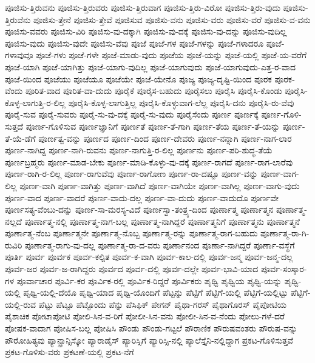 {ಪೂಜಿಸು-ತ್ತಿರುವನು
ಪೂಜಿಸು-ತ್ತಿರುವರು
ಪೂಜಿಸು-ತ್ತಿರುವಾಗ
ಪೂಜಿಸು-ತ್ತಿರು-ವಿರೋ
ಪೂಜಿಸು-ತ್ತಿರು-ವುದು
ಪೂಜಿಸು-ತ್ತಿರುವೆನು
ಪೂಜಿಸು-ತ್ತೇನೆ
ಪೂಜಿಸು-ತ್ತೇವೆ
ಪೂಜಿಸುವ
ಪೂಜಿಸು-ವನು
ಪೂಜಿಸು-ವರು
ಪೂಜಿಸು-ವರೆ
ಪೂಜಿಸು-ವ-ವನು
ಪೂಜಿಸು-ವವರು
ಪೂಜಿಸು-ವಿರಿ
ಪೂಜಿಸು-ವು-ದಕ್ಕಾಗಿ
ಪೂಜಿಸು-ವು-ದಕ್ಕೆ
ಪೂಜಿಸು-ವು-ದನ್ನು
ಪೂಜಿಸು-ವುದಿಲ್ಲ
ಪೂಜಿಸು-ವುದು
ಪೂಜಿಸು-ವುದೇ
ಪೂಜಿಸು-ವೆವು
ಪೂಜೆ
ಪೂಜೆ-ಗಳ
ಪೂಜೆ-ಗಳನ್ನು
ಪೂಜೆ-ಗಳಾದರೂ
ಪೂಜೆ-ಗಳಾವುವೂ
ಪೂಜೆ-ಗಳು
ಪೂಜೆ-ಗಳೇ
ಪೂಜೆ-ಮಾಡು-ವುದು
ಪೂಜೆಯ
ಪೂಜೆ-ಯನ್ನು
ಪೂಜೆ-ಯಲ್ಲಿ
ಪೂಜೆ-ಯ-ವರೆಗೆ
ಪೂಜೆ-ಯಾಗಿ
ಪೂಜೆ-ಯಾಗಿತ್ತು
ಪೂಜೆ-ಯಾಗು-ವುದಿಲ್ಲ
ಪೂಜೆ-ಯಾಗುವುದು
ಪೂಜೆ-ಯಾಗುವುದು-ಎತ್ತ-ರ-ವಾದ
ಪೂಜೆ-ಯಿಂದ
ಪೂಜೆಯು
ಪೂಜೆಯೂ
ಪೂಜೆಯೇ
ಪೂಜೆ-ಯೇನೊ
ಪೂಜ್ಯ
ಪೂಜ್ಯ-ದೃಷ್ಟಿ-ಯಿಂದ
ಪೂರಕ
ಪೂರಕ-ವೆಂದು
ಪೂರಿತ-ವಾದ
ಪೂರಿತ-ವಾ-ದುದು
ಪೂರೈಕೆ
ಪೂರೈಸ-ಬಹುದು
ಪೂರೈಸಲು
ಪೂರೈಸಿ
ಪೂರೈಸಿ-ಕೊಂಡು
ಪೂರೈಸಿ-ಕೊಳ್ಳ-ಲಾಗುತ್ತಿ-ರ-ಲಿಲ್ಲ
ಪೂರೈಸಿ-ಕೊಳ್ಳ-ಲಾಗುತ್ತಿಲ್ಲ
ಪೂರೈಸಿ-ಕೊಳ್ಳುವಾಗ-ಲೆಲ್ಲ
ಪೂರೈಸಿ-ದನು
ಪೂರೈಸಿ-ರು-ವೆವು
ಪೂರೈ-ಸುವ
ಪೂರೈ-ಸುವರು
ಪೂರೈ-ಸು-ವು-ದಕ್ಕೆ
ಪೂರೈ-ಸು-ವುದು
ಪೂರೈಸೆಂದು
ಪೂರ್ಣ
ಪೂರ್ಣಕ್ಕೆ
ಪೂರ್ಣ-ಗೊಳಿ-ಸುತ್ತದೆ
ಪೂರ್ಣ-ಗೊಳಿಸುವ
ಪೂರ್ಣಜ್ಞಾನಿಗೆ
ಪೂರ್ಣತೆ
ಪೂರ್ಣ-ತೆ-ಗಾಗಿ
ಪೂರ್ಣ-ತೆಯ
ಪೂರ್ಣ-ತೆ-ಯನ್ನು
ಪೂರ್ಣ-ತೆ-ಯೆ-ಡೆಗೆ
ಪೂರ್ಣತ್ವ-ವನ್ನು
ಪೂರ್ಣದ
ಪೂರ್ಣ-ದಿಂದ
ಪೂರ್ಣ-ದೇವರು
ಪೂರ್ಣ-ನನ್ನಾಗಿ
ಪೂರ್ಣ-ನಾಗ-ಲಾರ
ಪೂರ್ಣ-ನಾಗಿದ್ದ
ಪೂರ್ಣ-ನಾಗಿ-ರುವನು
ಪೂರ್ಣ-ನಾಗುತ್ತಿ-ರ-ಲಿಲ್ಲ
ಪೂರ್ಣನು
ಪೂರ್ಣ-ಪರಿ-ಶುದ್ಧ-ತೆಯೆ
ಪೂರ್ಣಬ್ರಹ್ಮರು
ಪೂರ್ಣ-ಮಾಡ-ಬೇಕು
ಪೂರ್ಣ-ಮಾಡಿ-ಕೊಳ್ಳು-ವು-ದಕ್ಕೆ
ಪೂರ್ಣ-ರಾಗದೆ
ಪೂರ್ಣ-ರಾಗ-ಲಾರೆವು
ಪೂರ್ಣ-ರಾಗಿ-ರ-ಲಿಲ್ಲ
ಪೂರ್ಣ-ರಾಗುವೆವು
ಪೂರ್ಣ-ರಾಗೋಣ
ಪೂರ್ಣ-ರಾ-ದಷ್ಟೂ
ಪೂರ್ಣ-ವನ್ನು
ಪೂರ್ಣ-ವಾಗ-ಲಿಲ್ಲ
ಪೂರ್ಣ-ವಾಗಿ
ಪೂರ್ಣ-ವಾಗಿತ್ತು
ಪೂರ್ಣ-ವಾಗಿದೆ
ಪೂರ್ಣ-ವಾಗಿಯೇ
ಪೂರ್ಣ-ವಾಗಿಲ್ಲ
ಪೂರ್ಣ-ವಾಗು-ವುದು
ಪೂರ್ಣ-ವಾದ
ಪೂರ್ಣ-ವಾದರೆ
ಪೂರ್ಣ-ವಾದು-ದಲ್ಲ
ಪೂರ್ಣ-ವಾ-ದುದು
ಪೂರ್ಣ-ವಾದುದೊ
ಪೂರ್ಣವೇ
ಪೂರ್ಣಸತ್ಯ-ವೆಂಬು-ದನ್ನು
ಪೂರ್ಣ-ಸಾ-ಮರಸ್ಯ-ವಿದೆ
ಪೂರ್ಣಸ್ವಾ-ತಂತ್ರ್ಯ-ದಿಂದ
ಪೂರ್ಣಾತ್ಮ
ಪೂರ್ಣಾತ್ಮನ
ಪೂರ್ಣಾತ್ಮ-ನಲ್ಲದೆ
ಪೂರ್ಣಾತ್ಮ-ನಲ್ಲಿ
ಪೂರ್ಣಾತ್ಮ-ನಾಗ-ಬಲ್ಲ
ಪೂರ್ಣಾತ್ಮ-ನಾಗಿದ್ದರೆ
ಪೂರ್ಣಾತ್ಮನಿಗೆ
ಪೂರ್ಣಾತ್ಮನು
ಪೂರ್ಣಾತ್ಮನೆ
ಪೂರ್ಣಾತ್ಮ-ನೆಂಬ
ಪೂರ್ಣಾತ್ಮನೇ
ಪೂರ್ಣಾತ್ಮ-ನೊಬ್ಬ
ಪೂರ್ಣಾತ್ಮ-ರನ್ನು
ಪೂರ್ಣಾತ್ಮ-ರಾಗ-ಬಹುದು
ಪೂರ್ಣಾತ್ಮ-ರಾ-ಗಿ-ರುವಿರಿ
ಪೂರ್ಣಾತ್ಮ-ರಾಗು-ವು-ದಲ್ಲ
ಪೂರ್ಣಾತ್ಮ-ರಾ-ದ-ವರು
ಪೂರ್ಣಾನಂದ
ಪೂರ್ಣಾ-ನಾಗಿದ್ದರೆ
ಪೂರ್ಣಾ-ವಸ್ಥೆಗೆ
ಪೂರ್ತಿ
ಪೂರ್ವ
ಪೂರ್ವಕ
ಪೂರ್ವ-ಕಲ್ಪಿತ
ಪೂರ್ವ-ಕ-ವಾಗಿ
ಪೂರ್ವ-ಕಾಲ-ದಲ್ಲಿ
ಪೂರ್ವ-ಜನ್ಮ
ಪೂರ್ವ-ಜನ್ಮ-ದಲ್ಲ
ಪೂರ್ವ-ಜರ
ಪೂರ್ವ-ಜ-ರಾಗಿದ್ದರು
ಪೂರ್ವದ
ಪೂರ್ವ-ದಲ್ಲಿ
ಪೂರ್ವ-ದಲ್ಲೇ
ಪೂರ್ವ-ಭಾವಿ-ಯಾದ
ಪೂರ್ವ-ಸಂಸ್ಕಾರ-ಗಳ
ಪೂರ್ವಾಚಾರ
ಪೂರ್ವಿ-ಕರ
ಪೂರ್ವಿಕ-ರಲ್ಲಿ
ಪೂರ್ವಿಕ-ರಿದ್ದರೆ
ಪೂರ್ವಿಕರು
ಪೃಥ್ವಿ
ಪೃಥ್ವಿಯ
ಪೃಥ್ವಿ-ಯನ್ನು
ಪೃಥ್ವಿ-ಯಲ್ಲಿ
ಪೃಥ್ವಿ-ಯಲ್ಲಿ-ದೆಯೊ
ಪೃಥ್ವಿ-ಯಾದ
ಪೃಥ್ವಿ-ಯೊಂದಿಗೆ
ಪೆಟ್ಟನ್ನು
ಪೆಟ್ಟಿಗೆ
ಪೆಟ್ಟಿಗೆ-ಯಲ್ಲಿ
ಪೆಟ್ಟಿಗೆ-ಯಲ್ಲಿಟ್ಟು
ಪೆಟ್ಟಿಗೆ-ಯಲ್ಲಿ-ರುವ
ಪೆಟ್ಟು
ಪೆಟ್ಟೂ
ಪೆಟ್ಟೊಂದು
ಪೆನ್ನು
ಪೆಸಿಫಿಕ್
ಪೇಗನ್
ಪೈಥಾ-ಗರಸ್
ಪೈಥಾಗೊರಸ್
ಪೈಪೋಟಿಯ
ಪೈಶಾಚಿಕ
ಪೋಟಾಪೋಟಿ
ಪೋಲಿ-ಸಿನ-ವ-ರಿಗೆ
ಪೋಲೀ-ಸಿನ-ವನು
ಪೋಲೀ-ಸಿನ-ವ-ನೆಂದು
ಪೋಲು-ಗಳೆ-ದರೆ
ಪೋಷಕ-ವಾದಾಗ
ಪೋಷಿಸ-ಬಲ್ಲ
ಪೋಷಿಸಿ
ಪೌಂಡು
ಪೌಂಡು-ಗಟ್ಟಲೆ
ಪೌರಾಣಿಕ
ಪೌರುಷವಂತರು
ಪೌರುಷ-ವನ್ನು
ಪೌರೋಹಿತ್ಯವು
ಪ್ಯಾನ್ಫ್ರಾನ್ಸಿಸ್ಕೋ
ಪ್ಯಾರಾಡೈಸ್
ಪ್ಯಾರಿಸ್ಸಿಗೆ
ಪ್ಯಾರಿಸ್ಸಿ-ನಲ್ಲಿ
ಪ್ಯಾಲೆಸ್ತೈನಿ-ನಲ್ಲಿದ್ದಾಗ
ಪ್ರಕಟ-ಗೊಳಿಸುತ್ತವೆ
ಪ್ರಕಟ-ಗೊಳಿಸು-ವರು
ಪ್ರಕಟಣೆ-ಯಲ್ಲಿ
ಪ್ರಕಟ-ನೆಗೆ
}
